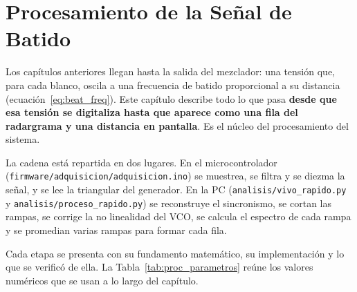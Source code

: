 \chapter{Procesamiento de la Señal de Batido}
\label{ch:procesamiento}

Los capítulos anteriores llegan hasta la salida del mezclador: una tensión
que, para cada blanco, oscila a una frecuencia de batido proporcional a su
distancia (ecuación~\eqref{eq:beat_freq}). Este capítulo describe todo lo que
pasa \textbf{desde que esa tensión se digitaliza hasta que aparece como una
fila del radargrama y una distancia en pantalla}. Es el núcleo del
procesamiento del sistema.

La cadena está repartida en dos lugares. En el microcontrolador
(\texttt{firmware/\allowbreak adquisicion/\allowbreak adquisicion.ino}) se muestrea, se filtra y se
diezma la señal, y se lee la triangular del generador. En la PC
(\texttt{analisis/\allowbreak vivo\_rapido.py} y \texttt{analisis/\allowbreak proceso\_rapido.py})
se reconstruye el sincronismo, se cortan las rampas, se corrige la no
linealidad del VCO, se calcula el espectro de cada rampa y se promedian
varias rampas para formar cada fila.

Cada etapa se presenta con su fundamento matemático, su implementación y lo
que se verificó de ella. La Tabla~\ref{tab:proc_parametros} reúne los valores
numéricos que se usan a lo largo del capítulo.

